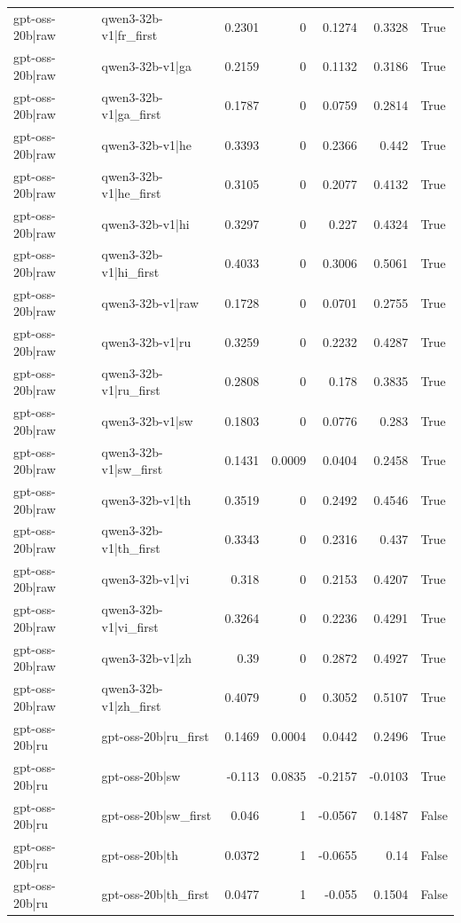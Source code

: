 \begin{table}
\begin{tabular}{l l r r r r l}
gpt-oss-20b|raw & qwen3-32b-v1|fr_first & 0.2301 & 0 & 0.1274 & 0.3328 & True \\
gpt-oss-20b|raw & qwen3-32b-v1|ga & 0.2159 & 0 & 0.1132 & 0.3186 & True \\
gpt-oss-20b|raw & qwen3-32b-v1|ga_first & 0.1787 & 0 & 0.0759 & 0.2814 & True \\
gpt-oss-20b|raw & qwen3-32b-v1|he & 0.3393 & 0 & 0.2366 & 0.442 & True \\
gpt-oss-20b|raw & qwen3-32b-v1|he_first & 0.3105 & 0 & 0.2077 & 0.4132 & True \\
gpt-oss-20b|raw & qwen3-32b-v1|hi & 0.3297 & 0 & 0.227 & 0.4324 & True \\
gpt-oss-20b|raw & qwen3-32b-v1|hi_first & 0.4033 & 0 & 0.3006 & 0.5061 & True \\
gpt-oss-20b|raw & qwen3-32b-v1|raw & 0.1728 & 0 & 0.0701 & 0.2755 & True \\
gpt-oss-20b|raw & qwen3-32b-v1|ru & 0.3259 & 0 & 0.2232 & 0.4287 & True \\
gpt-oss-20b|raw & qwen3-32b-v1|ru_first & 0.2808 & 0 & 0.178 & 0.3835 & True \\
gpt-oss-20b|raw & qwen3-32b-v1|sw & 0.1803 & 0 & 0.0776 & 0.283 & True \\
gpt-oss-20b|raw & qwen3-32b-v1|sw_first & 0.1431 & 0.0009 & 0.0404 & 0.2458 & True \\
gpt-oss-20b|raw & qwen3-32b-v1|th & 0.3519 & 0 & 0.2492 & 0.4546 & True \\
gpt-oss-20b|raw & qwen3-32b-v1|th_first & 0.3343 & 0 & 0.2316 & 0.437 & True \\
gpt-oss-20b|raw & qwen3-32b-v1|vi & 0.318 & 0 & 0.2153 & 0.4207 & True \\
gpt-oss-20b|raw & qwen3-32b-v1|vi_first & 0.3264 & 0 & 0.2236 & 0.4291 & True \\
gpt-oss-20b|raw & qwen3-32b-v1|zh & 0.39 & 0 & 0.2872 & 0.4927 & True \\
gpt-oss-20b|raw & qwen3-32b-v1|zh_first & 0.4079 & 0 & 0.3052 & 0.5107 & True \\
gpt-oss-20b|ru & gpt-oss-20b|ru_first & 0.1469 & 0.0004 & 0.0442 & 0.2496 & True \\
gpt-oss-20b|ru & gpt-oss-20b|sw & -0.113 & 0.0835 & -0.2157 & -0.0103 & True \\
gpt-oss-20b|ru & gpt-oss-20b|sw_first & 0.046 & 1 & -0.0567 & 0.1487 & False \\
gpt-oss-20b|ru & gpt-oss-20b|th & 0.0372 & 1 & -0.0655 & 0.14 & False \\
gpt-oss-20b|ru & gpt-oss-20b|th_first & 0.0477 & 1 & -0.055 & 0.1504 & False \\

\end{tabular}
\end{table}
